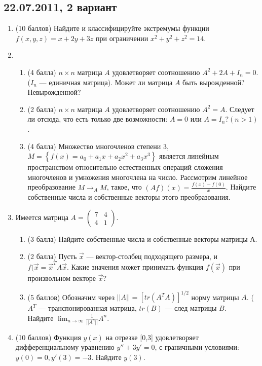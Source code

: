 \documentclass[pdftex,12pt,a4paper]{article}
\begin{document}
\subsection{22.07.2011, 2 вариант}
\begin{enumerate}
\item (10 баллов) Найдите и классифицируйте экстремумы функции $f(x,y,z)=x+2y+3z$ при ограничении $x^2+y^2+z^2=14$.\\
\item \begin{enumerate}
\item (4 балла) $n\times n$ матрица $A$ удовлетворяет соотношению $A^2+2A+I_n=0$. ($I_n$ --- единичная матрица). Может ли матрица $A$ быть вырожденной? Невырожденной?
\item (2 балла) $n\times n$ матрица $A$ удовлетворяет соотношению $A^2=A$. Следует ли отсюда, что  есть только две возможности: $A=0$ или $A=I_n? (n>1)$.
\item (4 балла) Множество многочленов степени 3, $M=\left\{f(x)=a_0+a_1x+a_2x^2+a_3x^3\right\}$ является линейным пространством относительно естественных операций сложения многочленов и умножения многочлена на число. Рассмотрим линейное преобразование $M\longrightarrow_A M$, такое, что $(Af)(x)=\frac{f(x)-f(0)}{x}$. Найдите собственные числа и собственные векторы этого преобразования.
\end{enumerate}
\item Имеется матрица $A=\left(\begin{array}{cc}
7 & 4\\
4 & 1
\end{array}\right)$.
\begin{enumerate}
\item (3 балла) Найдите собственные числа и собственные векторы матрицы А.
\item (2 балла) Пусть $\vec{x}$ --- вектор-столбец подходящего размера, и $f(\vec{x}=\vec{x}^T A \vec{x}$. Какие значения может принимать функция $f(\vec{x})$ при произвольном векторе $\vec{x}$?
\item  (5 баллов) Обозначим через $||A||=[tr(A^TA)]^{1/2}$ норму матрицы $A$. ($A^T$ --- транспонированная матрица, $tr(B)$ --- след матрицы $B$.\\
Найдите $\lim_{n\to \infty}\frac{1}{||A^n||} A^n$.
\end{enumerate}
\item (10 баллов) Функция $y(x)$ на отрезке [0,3] удовлетворяет дифференциальному уравнению $y''+3y'=0$, с граничными условиями: $y(0)=0, y'(3)=-3$. Найдите $y(3)$.\\

\end{enumerate}
\end{document}
